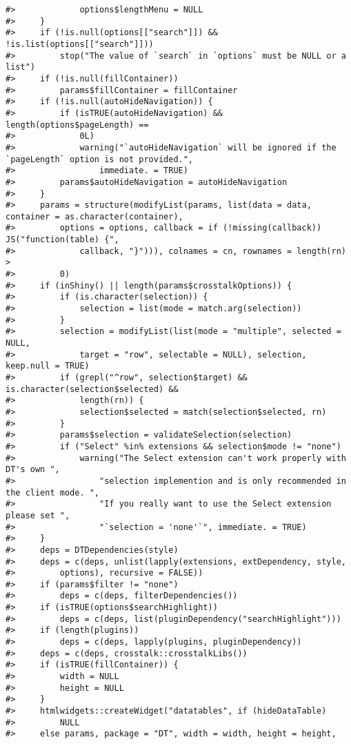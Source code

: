 \documentclass[
]{book}
\begin{document}
\begin{verbatim}
#>             options$lengthMenu = NULL
#>     }
#>     if (!is.null(options[["search"]]) && !is.list(options[["search"]])) 
#>         stop("The value of `search` in `options` must be NULL or a list")
#>     if (!is.null(fillContainer)) 
#>         params$fillContainer = fillContainer
#>     if (!is.null(autoHideNavigation)) {
#>         if (isTRUE(autoHideNavigation) && length(options$pageLength) == 
#>             0L) 
#>             warning("`autoHideNavigation` will be ignored if the `pageLength` option is not provided.", 
#>                 immediate. = TRUE)
#>         params$autoHideNavigation = autoHideNavigation
#>     }
#>     params = structure(modifyList(params, list(data = data, container = as.character(container), 
#>         options = options, callback = if (!missing(callback)) JS("function(table) {", 
#>             callback, "}"))), colnames = cn, rownames = length(rn) > 
#>         0)
#>     if (inShiny() || length(params$crosstalkOptions)) {
#>         if (is.character(selection)) {
#>             selection = list(mode = match.arg(selection))
#>         }
#>         selection = modifyList(list(mode = "multiple", selected = NULL, 
#>             target = "row", selectable = NULL), selection, keep.null = TRUE)
#>         if (grepl("^row", selection$target) && is.character(selection$selected) && 
#>             length(rn)) {
#>             selection$selected = match(selection$selected, rn)
#>         }
#>         params$selection = validateSelection(selection)
#>         if ("Select" %in% extensions && selection$mode != "none") 
#>             warning("The Select extension can't work properly with DT's own ", 
#>                 "selection implemention and is only recommended in the client mode. ", 
#>                 "If you really want to use the Select extension please set ", 
#>                 "`selection = 'none'`", immediate. = TRUE)
#>     }
#>     deps = DTDependencies(style)
#>     deps = c(deps, unlist(lapply(extensions, extDependency, style, 
#>         options), recursive = FALSE))
#>     if (params$filter != "none") 
#>         deps = c(deps, filterDependencies())
#>     if (isTRUE(options$searchHighlight)) 
#>         deps = c(deps, list(pluginDependency("searchHighlight")))
#>     if (length(plugins)) 
#>         deps = c(deps, lapply(plugins, pluginDependency))
#>     deps = c(deps, crosstalk::crosstalkLibs())
#>     if (isTRUE(fillContainer)) {
#>         width = NULL
#>         height = NULL
#>     }
#>     htmlwidgets::createWidget("datatables", if (hideDataTable) 
#>         NULL
#>     else params, package = "DT", width = width, height = height, 

\end{verbatim}
\end{document}
